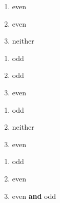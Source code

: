 \begin{multicols}{3}
\begin{enumerate}
\setcounter{enumi}{\value{HW}}

\item even
\item even
\item neither

\setcounter{HW}{\value{enumi}}
\end{enumerate}
\end{multicols}


\begin{multicols}{3}
\begin{enumerate}
\setcounter{enumi}{\value{HW}}

\item odd
\item odd
\item even

\setcounter{HW}{\value{enumi}}
\end{enumerate}
\end{multicols}

\begin{multicols}{3}
\begin{enumerate}
\setcounter{enumi}{\value{HW}}

\item odd
\item neither
\item even

\setcounter{HW}{\value{enumi}}
\end{enumerate}
\end{multicols}

\begin{multicols}{3}
\begin{enumerate}
\setcounter{enumi}{\value{HW}}

\item odd
\item even
\item even  \textbf{and} odd

\setcounter{HW}{\value{enumi}}
\end{enumerate}
\end{multicols}

